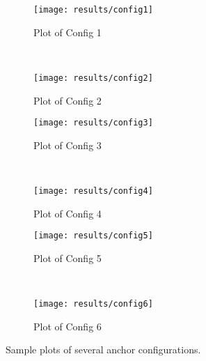     \begin{figure}[h!]
        \centering
        \begin{subfigure}[b]{0.49\textwidth}
            \texttt{[image: results/config1]}
            \caption{Plot of Config 1}
        \end{subfigure}
        ~ %
        \begin{subfigure}[b]{0.49\textwidth}
            \texttt{[image: results/config2]}
            \caption{Plot of Config 2}
        \end{subfigure}

        \begin{subfigure}[b]{0.49\textwidth}
            \texttt{[image: results/config3]}
            \caption{Plot of Config 3}
        \end{subfigure}
        ~ %
        \begin{subfigure}[b]{0.49\textwidth}
            \texttt{[image: results/config4]}
            \caption{Plot of Config 4}
        \end{subfigure}

        \begin{subfigure}[b]{0.49\textwidth}
            \texttt{[image: results/config5]}
            \caption{Plot of Config 5}
        \end{subfigure}
        ~ %
        \begin{subfigure}[b]{0.49\textwidth}
            \texttt{[image: results/config6]}
            \caption{Plot of Config 6}
        \end{subfigure}
        \caption{Sample plots of several anchor configurations.}
        \label{fig:config}
    \end{figure}

